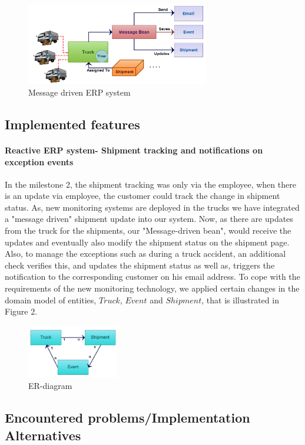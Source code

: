 \documentclass[twoside,colorbacktitle,accentcolor=tud1b]{tudexercise}
\begin{document}
\begin{figure}[h!]
  \centering
   \includegraphics[width=80mm]{TruckMessageBean.jpg}
   \caption{Message driven ERP system}
\end{figure}

\subsection{Implemented features}

\paragraph{Reactive ERP system- Shipment tracking and notifications on exception events}
In the milestone 2, the shipment tracking was only via the employee, when there is an update via employee, the customer could track the change in shipment status. As, new monitoring systems are deployed in the trucks we have integrated a "message driven" shipment update into our system. Now, as there are updates from the truck for the shipments, our "Message-driven bean", would receive the updates and eventually also modify the shipment status on the shipment page. Also, to manage the exceptions such as during a truck accident, an additional check verifies this, and updates the shipment status as well as, triggers the notification to the corresponding customer on his email address. To cope with the requirements of the new monitoring technology, we applied certain changes in the domain model of entities, $Truck$, $Event$ and $Shipment$, that is illustrated in Figure 2.

\begin{figure}[h!]
  \centering
   \includegraphics[width=40mm]{EntityRelationShip.jpg}
   \caption{ER-diagram}
\end{figure}

\subsection{Encountered problems/Implementation Alternatives}
\end{document}
